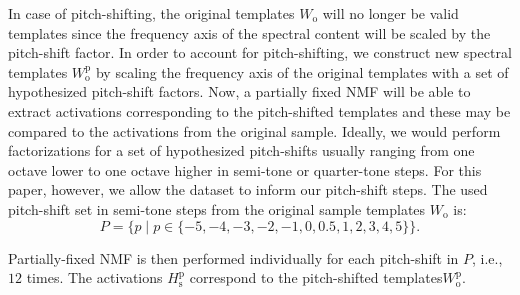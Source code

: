 \documentclass{article}
\begin{document}
In case of pitch-shifting, the original templates $W_{\mathrm{o}}$ will no longer be valid templates since the frequency axis of the spectral content will be scaled by the pitch-shift factor. In order to account for pitch-shifting, we construct new spectral templates $W_{\mathrm{o}}^{\mathrm{p}}$ by scaling the frequency axis of the original templates with a set of hypothesized pitch-shift factors. Now, a partially fixed NMF will be able to extract activations corresponding to the pitch-shifted templates and these may be compared to the activations from the original sample. Ideally, we would perform factorizations for a set of hypothesized pitch-shifts usually ranging from one octave lower to one octave higher in semi-tone or quarter-tone steps. For this paper, however, we allow the dataset to inform our pitch-shift steps. The used pitch-shift set in semi-tone steps from the original sample templates $W_\mathrm{o}$ is: 
\[ P = \{p \mid p \in \{-5,-4,-3,-2,-1,0,0.5,1,2,3,4,5\}\}.\]

Partially-fixed NMF is then performed individually for each pitch-shift in $P$, i.e., $12$ times. The activations $H_{\mathrm{s}}^{\mathrm{p}}$ correspond to the pitch-shifted templates$W_{\mathrm{o}}^{\mathrm{p}}$.
\end{document}
